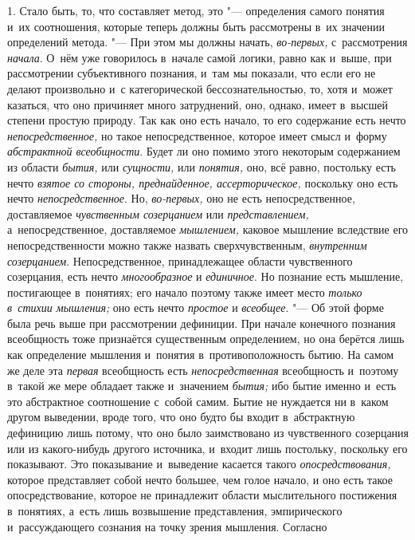1. Стало быть, то, что составляет метод, это
"--- определения самого понятия и~их соотношения, которые теперь
должны быть рассмотрены в~их значении определений метода. "---
При этом мы должны начать, {\em во-первых,} с~рассмотрения {\em начала}.
О~нём уже говорилось в~начале самой логики, равно как и~выше,
при рассмотрении субъективного познания, и~там мы показали, что если его не
делают произвольно и~с категорической бессознательностью, то, хотя и~может
казаться, что оно причиняет много затруднений, оно, однако,
имеет в~высшей степени простую природу. Так как оно есть начало, то его
содержание есть нечто {\em непосредственное,}
но такое непосредственное, которое имеет смысл и~форму
{\em абстрактной всеобщности}.
Будет ли оно помимо этого некоторым содержанием из области
{\em бытия,} или {\em сущности,} или {\em понятия,} оно, всё
равно, постольку есть нечто {\em взятое
со стороны, преднайденное, ассерторическое,} поскольку оно
есть нечто {\em непосредственное}. Но, {\em во-первых,}
оно не есть непосредственное, доставляемое
{\em чувственным созерцанием} или {\em представлением,}
а~непосредственное, доставляемое {\em мышлением,} каковое
мышление вследствие его непосредственности можно также назвать
сверхчувственным, {\em внутренним
созерцанием}. Непосредственное, принадлежащее области
чувственного созерцания, есть нечто
{\em многообразное} и {\em единичное}. Но
познание есть мышление, постигающее в~понятиях; его начало поэтому также
имеет место {\em только в~стихии
мышления;} оно есть нечто {\em простое} и {\em всеобщее}. "--- Об этой
форме была речь выше при рассмотрении дефиниции. При начале конечного
познания всеобщность тоже признаётся существенным определением, но она
берётся лишь как определение мышления и~понятия в~противоположность бытию.
На самом же деле эта {\em первая} всеобщность есть {\em непосредственная}
всеобщность и~поэтому в~такой же мере обладает также и~значением {\em бытия;}
ибо бытие именно и~есть это абстрактное соотношение с~собой
самим. Бытие не нуждается ни в~каком другом выведении, вроде того, что оно
будто бы входит в~абстрактную дефиницию лишь потому, что оно было
заимствовано из чувственного созерцания или из какого-нибудь другого
источника, и~входит лишь постольку, поскольку его показывают. Это
показывание и~выведение касается такого {\em опосредствования,}
которое представляет собой нечто большее, чем голое начало, и
оно есть такое опосредствование, которое не принадлежит области
мыслительного постижения в~понятиях, а~есть лишь возвышение представления,
эмпирического и~рассуждающего сознания на точку зрения мышления. Согласно
